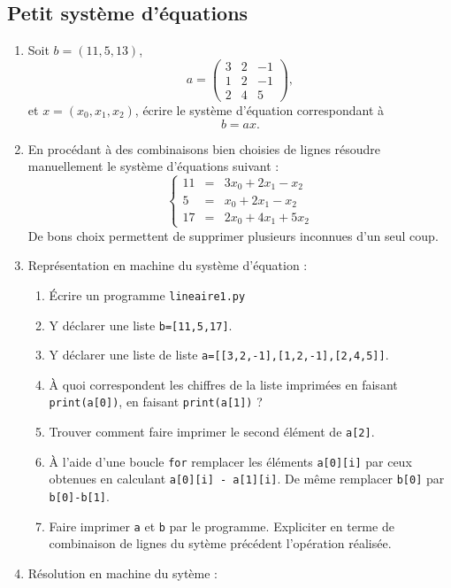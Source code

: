 \subsection{Petit système d'équations}
\begin{enumerate}
  \item Soit $b=(11,5,13)$, \[a=\left(
        \begin{array}{ccc}
          3 & 2 & -1 \\
          1 & 2 & -1 \\
          2 & 4 & 5 
          \end{array}
        \right), \]
      et $x = (x_0, x_1, x_2)$, écrire le système d'équation correspondant à
      $$ b=ax.$$
  
\item En procédant à des combinaisons bien choisies de lignes résoudre
  manuellement le système d'équations suivant :
  \[
    \left\{
      \begin{array}{rcl}
        11 & = & 3x_0 + 2x_1 -x_2 \\
        5  & = & x_0 + 2x_1 -x_2 \\
        17 & = & 2x_0+4x_1 + 5x_2
      \end{array}
    \right.
  \]
  De bons choix permettent de supprimer plusieurs inconnues d'un seul coup.
\item Représentation en machine du système d'équation :
  \begin{enumerate}
  \item Écrire un programme \verb+lineaire1.py+
  \item Y déclarer une liste \verb+b=[11,5,17]+.
  \item Y déclarer une liste de liste \verb+a=[[3,2,-1],[1,2,-1],[2,4,5]]+.
  \item À quoi correspondent les chiffres de la liste imprimées en faisant
    \verb+print(a[0])+, en faisant \verb+print(a[1])+ ?
  \item Trouver comment faire imprimer le second élément de \verb+a[2]+.
  \item À l'aide d'une boucle \verb+for+ remplacer les éléments \verb+a[0][i]+
    par ceux obtenues en calculant \verb+a[0][i] - a[1][i]+. De même remplacer
    \verb+b[0]+ par \verb+b[0]-b[1]+.
  \item Faire imprimer \verb+a+ et \verb+b+ par le programme. Expliciter en terme
    de combinaison de lignes du sytème précédent l'opération réalisée. 
  \end{enumerate}
\item Résolution en machine du sytème :

\end{enumerate}
